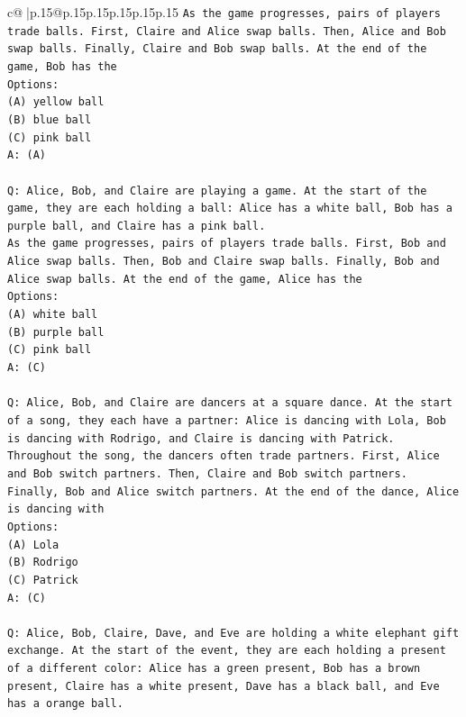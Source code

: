 \documentclass{article}
\begin{document}
{\begin{supertabular}{c@{$\;$}|p{.15\linewidth}@{}p{.15\linewidth}p{.15\linewidth}p{.15\linewidth}p{.15\linewidth}p{.15\linewidth}}
{{{\texttt{As the game progresses, pairs of players trade balls. First, Claire and Alice swap balls. Then, Alice and Bob swap balls. Finally, Claire and Bob swap balls. At the end of the game, Bob has the} \\
\texttt{Options:} \\
\texttt{(A) yellow ball} \\
\texttt{(B) blue ball} \\
\texttt{(C) pink ball} \\
\texttt{A: (A)} \\
\\ 
\texttt{Q: Alice, Bob, and Claire are playing a game. At the start of the game, they are each holding a ball: Alice has a white ball, Bob has a purple ball, and Claire has a pink ball.} \\
\texttt{As the game progresses, pairs of players trade balls. First, Bob and Alice swap balls. Then, Bob and Claire swap balls. Finally, Bob and Alice swap balls. At the end of the game, Alice has the} \\
\texttt{Options:} \\
\texttt{(A) white ball} \\
\texttt{(B) purple ball} \\
\texttt{(C) pink ball} \\
\texttt{A: (C)} \\
\\ 
\texttt{Q: Alice, Bob, and Claire are dancers at a square dance. At the start of a song, they each have a partner: Alice is dancing with Lola, Bob is dancing with Rodrigo, and Claire is dancing with Patrick.} \\
\texttt{Throughout the song, the dancers often trade partners. First, Alice and Bob switch partners. Then, Claire and Bob switch partners. Finally, Bob and Alice switch partners. At the end of the dance, Alice is dancing with} \\
\texttt{Options:} \\
\texttt{(A) Lola} \\
\texttt{(B) Rodrigo} \\
\texttt{(C) Patrick} \\
\texttt{A: (C)} \\
\\ 
\texttt{Q: Alice, Bob, Claire, Dave, and Eve are holding a white elephant gift exchange. At the start of the event, they are each holding a present of a different color: Alice has a green present, Bob has a brown present, Claire has a white present, Dave has a black ball, and Eve has a orange ball.} \\
}}}
\end{supertabular}}
\end{document}
